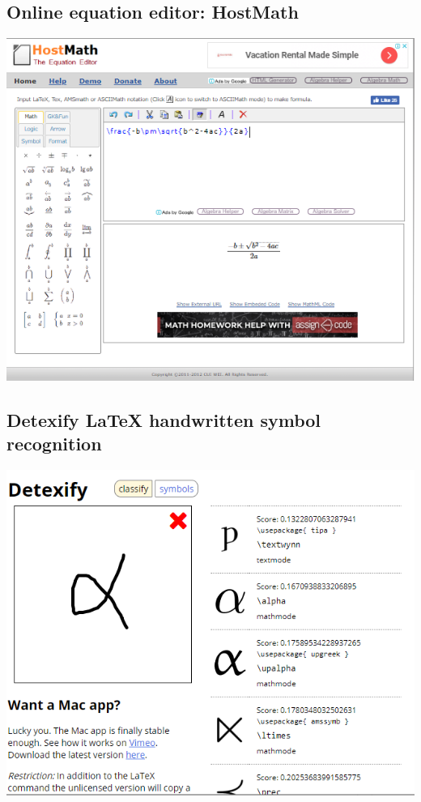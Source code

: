 \subsection{Online equation editor: HostMath }
\begin{center}
	\includegraphics[width=1\linewidth]{bab2/Hosmath}
	\label{fig:hosmath}
\end{center}




\newpage
\subsection{Detexify LaTeX handwritten symbol recognition}
\begin{center}
	\includegraphics[width=\linewidth]{bab2/Detexify}
	\label{fig:detexify}
\end{center}
\newpage
